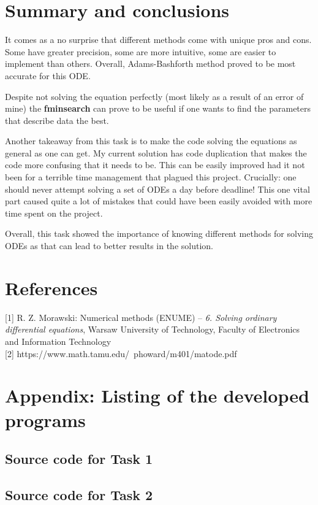 \documentclass[11pt]{article}
\begin{document}
\newpage
\section{Summary and conclusions}
It comes as a no surprise that different methods come with unique pros and cons.
Some have greater precision, some are more intuitive, some are easier to
implement than others. Overall, Adams-Bashforth method proved to be most
accurate for this ODE. 

Despite not solving the equation perfectly (most likely as a result of an error
of mine) the \textbf{fminsearch} can prove to be useful if one wants to find
the parameters that describe data the best.

Another takeaway from this task is to make the code solving the equations as general as one can get.
My current solution has code duplication that makes the code more confusing that it needs to be.
This can be easily improved had it not been for a terrible time management that plagued this project. 
Crucially: one should never attempt solving a set of ODEs a day before deadline!
This one vital part caused quite a lot of mistakes that could have been easily avoided with more time spent on the project.

Overall, this task showed the importance of knowing different methods for solving ODEs as that can lead to better results in the solution.

\newpage
\section{References}
{[1]} R. Z. Morawski: Numerical methods (ENUME) – \emph{6. Solving ordinary
differential equations}, Warsaw University of Technology, Faculty of
Electronics and Information Technology \\
{[2]} https://www.math.tamu.edu/~phoward/m401/matode.pdf

\newpage
\section{Appendix: Listing of the developed programs}
\subsection{Source code for Task 1}

\newpage
\subsection{Source code for Task 2}

\newpage
\end{document}

